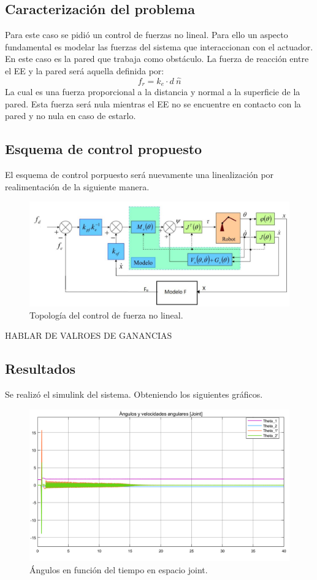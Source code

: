%

%

\subsection{Caracterizaci\'on del problema}
Para este caso se pidi\'o un control de fuerzas no lineal. Para ello un aspecto fundamental es modelar las fuerzas del sistema que interaccionan con el actuador.
En este caso es la pared que trabaja como obst\'aculo. La fuerza de reacci\'on entre el EE y la pared ser\'a aquella definida por:
\begin{equation}
f_r = k_e \cdot d \ \hat{n}
\end{equation}
La cual es una fuerza proporcional a la distancia y normal a la superficie de la pared.
Esta fuerza  ser\'a nula mientras el EE no se encuentre en contacto con la pared y no nula en caso de estarlo.

\subsection{Esquema de control propuesto}
El esquema de control porpuesto ser\'a nuevamente una linealizaci\'on por realimentaci\'on de la siguiente manera.
\begin{figure}[H]
	\centering
	\includegraphics[width=0.8\linewidth]{ImagenesControl de fuerza no lineal/controlf}
	\caption{Topolog\'ia del control de fuerza no lineal.}	
	\label{fig:control_f_modelo}
\end{figure}


HABLAR DE VALROES DE GANANCIAS
\subsection{Resultados}
Se realiz\'o el simulink del sistema. Obteniendo los siguientes gr\'aficos.

\begin{figure}[H]
	\centering
	\includegraphics[width=0.8\linewidth]{ImagenesControl de fuerza no lineal/2_3_a}
	\caption{\'Angulos en funci\'on del tiempo en espacio joint.}	
	\label{fig:athetas}
\end{figure}

